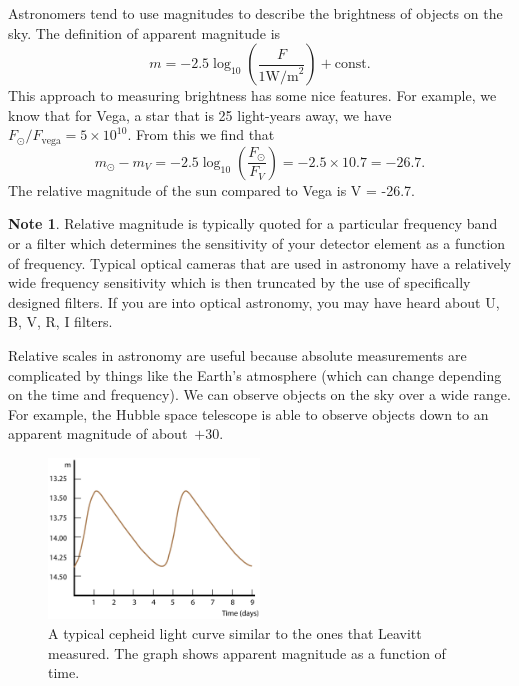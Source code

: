\documentclass[a4paper,12pt]{article}
\theoremstyle{remark}
\newcommand{\mrm}[1]{\mathrm{#1}}
\renewcommand{\=}[1]{\stackrel{#1}{=}} %
\theoremstyle{plain}
\theoremstyle{definition}
\newtheorem*{definitionT}{Note}%
\newenvironment{note}{
\begin{dBox}
\begin{definitionT}}
{\end{definitionT}
\end{dBox}}
\begin{document}
Astronomers tend to use magnitudes to describe the brightness of objects on the sky. The definition of apparent magnitude is 
\begin{equation}
m = -2.5 \log _{10} \left( \frac{F}{1 \mrm{W/m}^{2}} \right) + \mrm{const}.
\end{equation}
This approach to measuring brightness has some nice features. For example, we know that for Vega, a star that is 25 light-years away, we have $F_\odot / F_\mrm{vega} = 5\times 10^{10}$. From this we find that
\begin{equation}
m_\odot - m_V = -2.5 \log _{10} \left( \frac{F_\odot}{F_V} \right) = -2.5 \times 10.7 = -26.7.
\end{equation}
The relative magnitude of the sun compared to Vega is V = -26.7. 

\begin{note}
Relative magnitude is typically quoted for a particular frequency band or a filter which determines the sensitivity of your detector element as a function of frequency. Typical optical cameras that are used in astronomy have a relatively wide frequency sensitivity which is then truncated by the use of specifically designed filters. If you are into optical astronomy, you may have heard about U, B, V, R, I filters.
\end{note}

Relative scales in astronomy are useful because absolute measurements are complicated by things like the Earth's atmosphere (which can change depending on the time and frequency). We can observe objects on the sky over a wide range. For example, the Hubble space telescope is able to observe objects down to an apparent magnitude of about~$+30$.

\begin{figure}[t]
\begin{center}
    \includegraphics*[angle=0,width=0.5\textwidth]{img/cepheids.png}
    \caption[Insert text]{A typical cepheid light curve similar to the ones that Leavitt measured. The graph shows apparent magnitude as a function of time.}
\label{fig:cepheids}
\end{center}
\end{figure}
\end{document}
